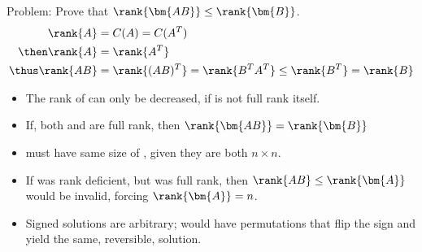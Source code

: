 \begin{itemize}
\begin{enumerate}
{    Problem: Prove that \(\rank{\bm{AB}} \leq \rank{ \bm{B} }\).
    }
    \begin{align*}
      \rank{A} &= C(A) = C(A^T)\\
      \then \rank{A} &= \rank{A^T} \\
      \thus \rank{AB} &= \rank{(AB)^T} = \rank{B^TA^T} \leq \rank{B^T} = \rank{B}
    \end{align*}
    \begin{itemize}
      \item The rank of  can only be decreased, if  is not full
        rank itself.
      \item If, both  and  are full rank, then
        \(\rank{\bm{AB}} = \rank{\bm{B}}\)
    \end{itemize}

    \begin{itemize}
      \item {} must have same size of , given they are both \(n
        \times n\).
      \item If  was rank deficient, but  was full rank, then
      \(\rank{AB} \leq \rank{\bm{A}}\) would be invalid, forcing
      \(\rank{\bm{A}} = n\).
    \end{itemize}

    \begin{itemize}
      \item Signed solutions are arbitrary;  would have permutations that
        flip the sign and yield the same, reversible, solution.
    \end{itemize}

  \end{enumerate}



\end{itemize}

